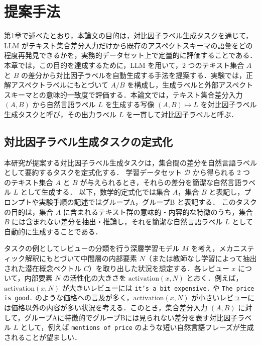 \chapter{提案手法}

第1章で述べたとおり，本論文の目的は，対比因子ラベル生成タスクを通じて，LLM がテキスト集合差分入力だけから既存のアスペクトスキーマの語彙をどの程度再発見できるかを，実務的データセット上で定量的に評価することである．本章では，この目的を達成するために，LLM を用いて，2 つのテキスト集合 $A$ と $B$ の差分から対比因子ラベルを自動生成する手法を提案する．実験では，正解アスペクトラベルにもとづいて $A/B$ を構成し，生成ラベルと外部アスペクトスキーマとの意味的一致度で評価する．本論文では，テキスト集合差分入力 $(A,B)$ から自然言語ラベル $L$ を生成する写像 $(A,B)\mapsto L$ を対比因子ラベル生成タスクと呼び，その出力ラベル $L$ を一貫して対比因子ラベルと呼ぶ．

\section{対比因子ラベル生成タスクの定式化}

本研究が提案する対比因子ラベル生成タスクは，集合間の差分を自然言語ラベルとして要約するタスクを定式化する．
学習データセット $\mathcal{D}$ から得られる 2 つのテキスト集合 $A$ と $B$ が与えられるとき，それらの差分を簡潔な自然言語ラベル $L$ として生成する．
以下，数学的定式化では集合 $A$，集合 $B$ と表記し，プロンプトや実験手順の記述ではグループA，グループB と表記する．
このタスクの目的は，集合 $A$ に含まれるテキスト群の意味的・内容的な特徴のうち，集合 $B$ には含まれない差分を抽出・推論し，それを簡潔な自然言語ラベル $L$ として自動的に生成することである．


タスクの例としてレビューの分類を行う深層学習モデル $M$ を考え，メカニスティック解釈にもとづいて中間層の内部要素 $N$（または教師なし学習によって抽出された潜在概念ベクトル $C$）を取り出した状況を想定する．各レビュー $x$ について，内部要素 $N$ の活性化の大きさを $\text{activation}(x, N)$ とおく．例えば，$\text{activation}(x, N)$ が大きいレビューには \texttt{it's a bit expensive.} や \texttt{The price is good.} のような価格への言及が多く，$\text{activation}(x, N)$ が小さいレビューには価格以外の内容が多い状況を考える．このとき，集合差分入力 $(A,B)$ に対して，グループAに特徴的でグループBには見られない差分を表す対比因子ラベル $L$ として，例えば \texttt{mentions of price} のような短い自然言語フレーズが生成されることが望ましい．

